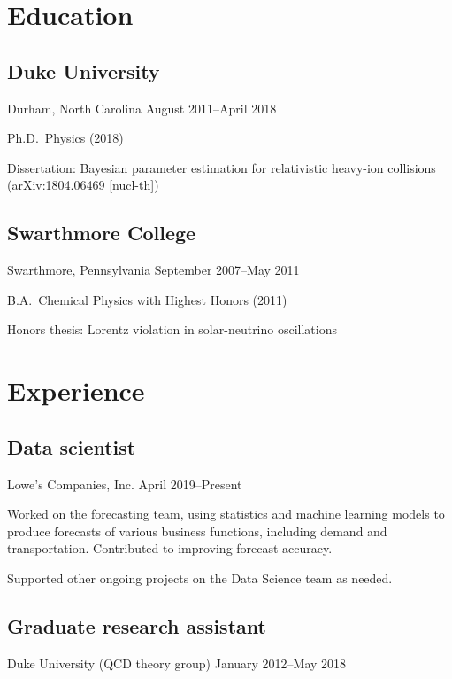 \documentclass[letterpaper,10pt]{article}
\begin{document}
\begin{multicols}{2}

\newcommand{\subheading}[3]{{\small #1 \hfill #2--#3}}

\section{Education}

\subsection{Duke University}
\subheading{Durham, North Carolina}{August 2011}{April 2018}

Ph.D.\ Physics (2018)

Dissertation: Bayesian parameter estimation for relativistic heavy-ion collisions
(\href{https://arxiv.org/abs/1804.06469}{arXiv:1804.06469 [nucl-th]})

\subsection{Swarthmore College}
\subheading{Swarthmore, Pennsylvania}{September 2007}{May 2011}

B.A.\ Chemical Physics with Highest Honors (2011)

Honors thesis: Lorentz violation in solar-neutrino oscillations


\section{Experience}

\subsection{Data scientist}
\subheading{Lowe's Companies, Inc.}{April 2019}{Present}

Worked on the forecasting team, using statistics and machine learning models to produce forecasts of various business functions, including demand and transportation.
Contributed to improving forecast accuracy.

Supported other ongoing projects on the Data Science team as needed.

\subsection{Graduate research assistant}
\subheading{Duke University (QCD theory group)}{January 2012}{May 2018}


\end{multicols}
\end{document}
